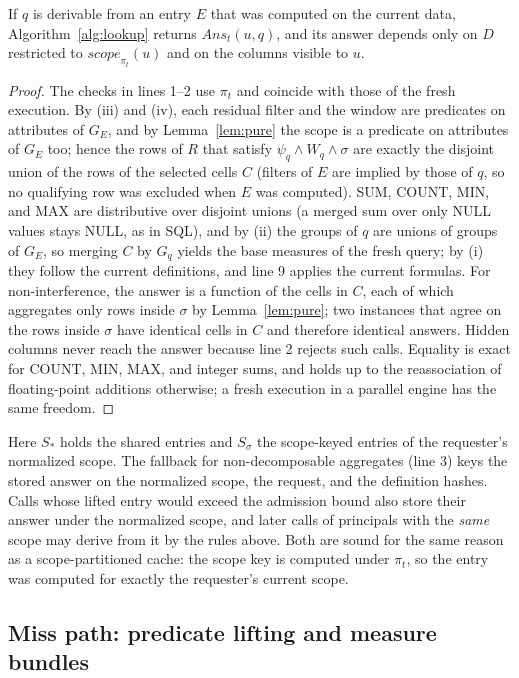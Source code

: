 \documentclass[sigconf, nonacm]{acmart}
\newcommand{\scope}{\mathit{scope}}
\begin{document}
\begin{theorem}
\label{thm:sound}
If $q$ is derivable from an entry $E$ that was computed on the current data, Algorithm~\ref{alg:lookup} returns $\mathit{Ans}_t(u,q)$, and its answer depends only on $D$ restricted to $\scope_{\pi_t}(u)$ and on the columns visible to $u$.
\end{theorem}
\begin{proof}
The checks in lines 1--2 use $\pi_t$ and coincide with those of the fresh execution. By (iii) and (iv), each residual filter and the window are predicates on attributes of $G_E$, and by Lemma~\ref{lem:pure} the scope is a predicate on attributes of $G_E$ too; hence the rows of $R$ that satisfy $\psi_q\wedge W_q\wedge\sigma$ are exactly the disjoint union of the rows of the selected cells $C$ (filters of $E$ are implied by those of $q$, so no qualifying row was excluded when $E$ was computed). SUM, COUNT, MIN, and MAX are distributive over disjoint unions (a merged sum over only NULL values stays NULL, as in SQL), and by (ii) the groups of $q$ are unions of groups of $G_E$, so merging $C$ by $G_q$ yields the base measures of the fresh query; by (i) they follow the current definitions, and line 9 applies the current formulas. For non-interference, the answer is a function of the cells in $C$, each of which aggregates only rows inside $\sigma$ by Lemma~\ref{lem:pure}; two instances that agree on the rows inside $\sigma$ have identical cells in $C$ and therefore identical answers. Hidden columns never reach the answer because line 2 rejects such calls. Equality is exact for COUNT, MIN, MAX, and integer sums, and holds up to the reassociation of floating-point additions otherwise; a fresh execution in a parallel engine has the same freedom.
\end{proof}

Here $S_*$ holds the shared entries and $S_\sigma$ the scope-keyed entries of the requester's normalized scope. The fallback for non-decomposable aggregates (line 3) keys the stored answer on the normalized scope, the request, and the definition hashes. Calls whose lifted entry would exceed the admission bound also store their answer under the normalized scope, and later calls of principals with the \emph{same} scope may derive from it by the rules above. Both are sound for the same reason as a scope-partitioned cache: the scope key is computed under $\pi_t$, so the entry was computed for exactly the requester's current scope.

\subsection{Miss path: predicate lifting and measure bundles}
\end{document}
